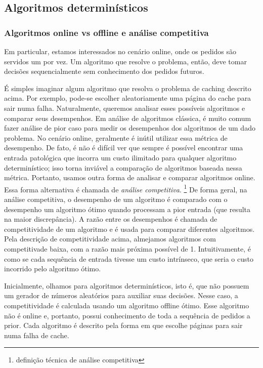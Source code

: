 \documentclass[a4paper,oneside,reqno,12pt]{amsart}
\begin{document}
\subsection{Algoritmos determinísticos}

\subsubsection{Algoritmos online vs offline e análise competitiva}

Em particular, estamos interessados no cenário online, onde os pedidos são servidos um por vez. Um algoritmo que resolve o problema, então, deve tomar decisões sequencialmente sem conhecimento dos pedidos futuros. 

É simples imaginar algum algoritmo que resolva o problema de caching descrito acima. Por exemplo, pode-se escolher aleatoriamente uma página do cache para sair numa falha. Naturalmente, queremos analisar esses possíveis algoritmos e comparar seus desempenhos. Em análise de algoritmos clássica, é muito comum fazer análise de pior caso para medir os desempenhos dos algoritmos de um dado problema. No cenário online, geralmente é inútil utilizar essa métrica de desempenho. De fato, é não é difícil ver que sempre é possível encontrar uma entrada patológica que incorra um custo ilimitado para qualquer algoritmo determinístico; isso torna inviável a comparação de algoritmos baseada nessa métrica. Portanto, usamos outra forma de analisar e comparar algoritmos online. Essa forma alternativa é chamada de \textit{análise competitiva}. \footnote {definição técnica de análise competitiva} De forma geral, na análise competitiva, o desempenho de um algoritmo é comparado com o desempenho um algoritmo ótimo quando processam a pior entrada (que resulta na maior discrepância). A razão entre os desempenhos é chamada de competitividade de um algoritmo e é usada para comparar diferentes algoritmos. Pela descrição de competitividade acima, almejamos algoritmos com competitivade baixa, com a razão mais próxima possível de 1. Intuitivamente, é como se cada sequência de entrada tivesse um custo intrínseco, que seria o custo incorrido pelo algoritmo ótimo.

Inicialmente, olhamos para algoritmos determinísticos, isto é, que não possuem um gerador de números aleatórios para auxiliar suas decisões. Nesse caso, a competitividade é calculada usando um algoritmo offline ótimo. Esse algoritmo não é online e, portanto, possui conhecimento de toda a sequência de pedidos a prior. Cada algoritmo é descrito pela forma em que escolhe páginas para sair numa falha de cache.
\end{document}
